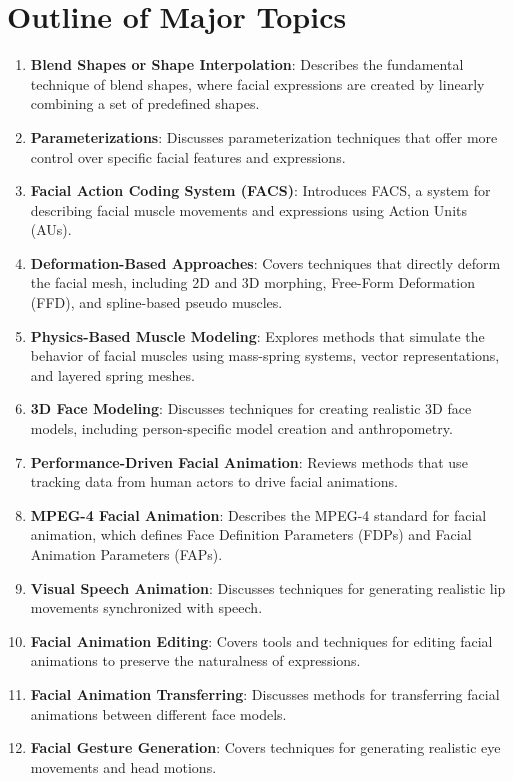 \documentclass[12pt]{article}
\begin{document}
\section{Outline of Major Topics}
\begin{enumerate}[noitemsep]
    \item \textbf{Blend Shapes or Shape Interpolation}: Describes the fundamental technique of blend shapes, where facial expressions are created by linearly combining a set of predefined shapes.
    \item \textbf{Parameterizations}: Discusses parameterization techniques that offer more control over specific facial features and expressions.
    \item \textbf{Facial Action Coding System (FACS)}: Introduces FACS, a system for describing facial muscle movements and expressions using Action Units (AUs).
    \item \textbf{Deformation-Based Approaches}: Covers techniques that directly deform the facial mesh, including 2D and 3D morphing, Free-Form Deformation (FFD), and spline-based pseudo muscles.
    \item \textbf{Physics-Based Muscle Modeling}: Explores methods that simulate the behavior of facial muscles using mass-spring systems, vector representations, and layered spring meshes.
    \item \textbf{3D Face Modeling}: Discusses techniques for creating realistic 3D face models, including person-specific model creation and anthropometry.
    \item \textbf{Performance-Driven Facial Animation}: Reviews methods that use tracking data from human actors to drive facial animations.
    \item \textbf{MPEG-4 Facial Animation}: Describes the MPEG-4 standard for facial animation, which defines Face Definition Parameters (FDPs) and Facial Animation Parameters (FAPs).
    \item \textbf{Visual Speech Animation}: Discusses techniques for generating realistic lip movements synchronized with speech.
    \item \textbf{Facial Animation Editing}: Covers tools and techniques for editing facial animations to preserve the naturalness of expressions.
    \item \textbf{Facial Animation Transferring}: Discusses methods for transferring facial animations between different face models.
    \item \textbf{Facial Gesture Generation}: Covers techniques for generating realistic eye movements and head motions.
\end{enumerate}
\end{document}
